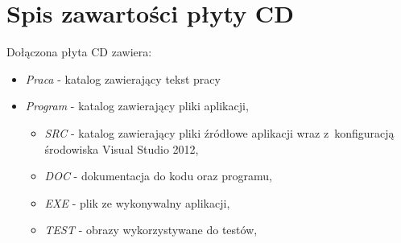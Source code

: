 \chapter{Spis zawartości płyty CD}
\label{cha:zawartoscCD}

Dołączona płyta CD zawiera:
\begin{itemize}
\item \emph{Praca} - katalog zawierający tekst pracy
\item \emph{Program} - katalog zawierający pliki aplikacji,
\begin{itemize}
\item \emph{SRC} - katalog zawierający pliki źródłowe aplikacji wraz z~konfiguracją środowiska Visual Studio 2012,
\item \emph{DOC} - dokumentacja do kodu oraz programu,
\item \emph{EXE} - plik ze wykonywalny aplikacji,
\item \emph{TEST} - obrazy wykorzystywane do testów,
\end{itemize}
\end{itemize}
